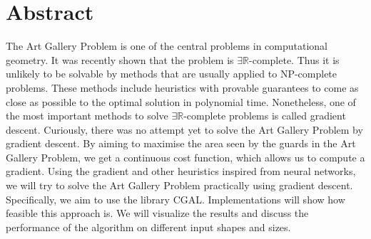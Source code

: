 \section*{Abstract}


The Art Gallery Problem is one of the central problems in computational geometry. It was recently shown that the problem is $\exists \mathbb{R}$-complete. Thus it is unlikely to be solvable by methods that are usually applied to NP-complete problems. These methods include heuristics with provable guarantees to come as close as possible to the optimal solution in polynomial time. Nonetheless, one of the most important methods to solve $\exists \mathbb{R}$-complete problems is called gradient descent. Curiously, there was no attempt yet to solve the Art Gallery Problem by gradient descent. By aiming to maximise the area seen by the guards in the Art Gallery Problem, we get a continuous cost function, which allows us to compute a gradient. Using the gradient and other heuristics inspired from neural networks, we will try to solve the Art Gallery Problem practically using gradient descent. Specifically, we aim to use the library CGAL. 
Implementations will show how feasible this approach is. We will visualize the results and discuss the performance of the algorithm on different input shapes and sizes.